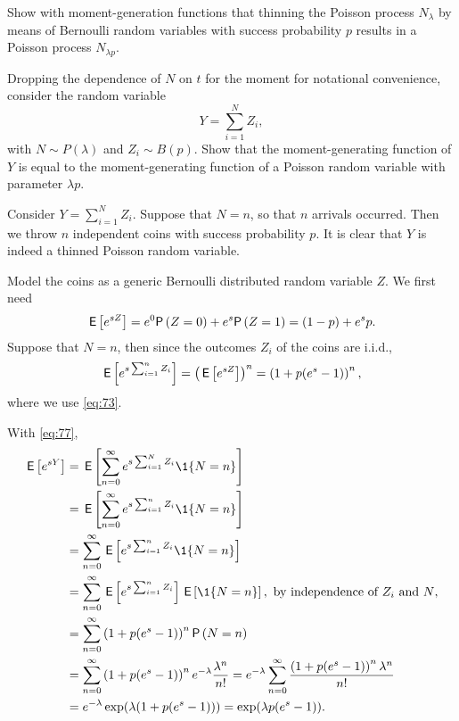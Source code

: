 \begin{exercise}\label{ex:1}
  Show with moment-generation functions that thinning the Poisson process $N_\lambda$ by means of Bernoulli random variables with success probability $p$ results in a Poisson process $N_{\lambda p}$.
  \begin{hint}
Dropping the dependence of $N$ on $t$ for the moment for notational convenience,  consider the random variable 
  \begin{equation*}
    Y = \sum_{i=1}^N Z_i,
  \end{equation*}
  with $N\sim P(\lambda)$ and $Z_i\sim B(p)$. Show that the moment-generating function of $Y$ is equal to the moment-generating
  function of a Poisson random variable with parameter $\lambda p$.
  \end{hint}
    \begin{solution}
Consider $Y=\sum_{i=1}^N Z_i$. Suppose that $N=n$, so that $n$
arrivals occurred. Then we throw $n$ independent coins with success probability
$p$. It is clear that $Y$ is indeed a thinned Poisson random variable.

Model the coins as a generic Bernoulli distributed random variable
$Z$.  We first need
\begin{equation*}
  \E{e^{s Z}} = e^0 \P{Z=0} + e^{s} \P{Z=1} = (1-p) + e^s p.
\end{equation*}
Suppose that $N=n$, then since the outcomes $Z_i$ of the coins are i.i.d.,
\begin{equation*}
\,\mathsf{E}\left[e^{s\sum_{i=1}^n Z_i}\right] = \left(\,\mathsf{E}\left[e^{s Z}\right]\right)^n = \left(1 + p (e^s - 1)\right)^n,
\end{equation*}
where we use \eqref{eq:73}. 

With  \eqref{eq:77}, 
\begin{align*}
  \E{e^{s Y}}
&= \E{\sum_{n=0}^\infty e^{s\sum_{i=1}^N Z_i} \1{N=n}} \\
&= \E{\sum_{n=0}^\infty e^{s\sum_{i=1}^n Z_i} \1{N=n}} \\
&= \sum_{n=0}^\infty \E{e^{s\sum_{i=1}^n Z_i} \1{N=n}} \\
&= \sum_{n=0}^\infty \E{e^{s\sum_{i=1}^n Z_i}} \E{\1{N=n}}, \text{ by independence of $Z_i$ and $N$}, \\
&= \sum_{n=0}^\infty \left(1+p(e^s-1)\right)^n \P{N=n} \\
&= \sum_{n=0}^\infty \left(1+p(e^s-1)\right)^n e^{-\lambda} \frac{\lambda^n}{n!}
= e^{-\lambda} \sum_{n=0}^\infty \frac{\left(1+p(e^s-1)\right)^n \lambda^n}{n!}\\
&= e^{-\lambda} \exp(\lambda (1+p(e^s-1))) = \exp(\lambda p (e^s - 1)).
\end{align*}
\end{solution}
\end{exercise}    

